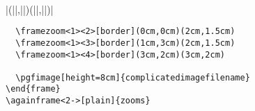 \begin{command}{\framezoom{}\\|(||,||)(||,||)|}
\begin{verbatim}
  \framezoom<1><2>[border](0cm,0cm)(2cm,1.5cm)
  \framezoom<1><3>[border](1cm,3cm)(2cm,1.5cm)
  \framezoom<1><4>[border](3cm,2cm)(3cm,2cm)

  \pgfimage[height=8cm]{complicatedimagefilename}
\end{frame}
\againframe<2->[plain]{zooms}
\end{verbatim}
\end{command}
